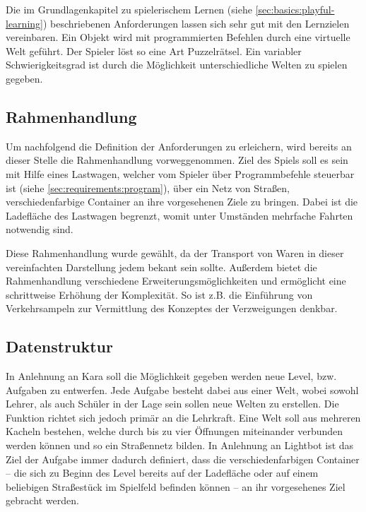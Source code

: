 Die im Grundlagenkapitel zu spielerischem Lernen (siehe \ref{sec:basics:playful-learning}) beschriebenen Anforderungen lassen sich sehr gut mit den Lernzielen vereinbaren. Ein Objekt wird mit programmierten Befehlen durch eine virtuelle Welt geführt. Der Spieler löst so eine Art Puzzelrätsel. Ein variabler Schwierigkeitsgrad ist durch die Möglichkeit unterschiedliche Welten zu spielen gegeben.

\subsection{Rahmenhandlung}
\label{sec:requirements:world:background-story}

Um nachfolgend die Definition der Anforderungen zu erleichern, wird bereits an dieser Stelle die Rahmenhandlung vorweggenommen. Ziel des Spiels soll es sein mit Hilfe eines Lastwagen, welcher vom Spieler über Programmbefehle steuerbar ist (siehe \ref{sec:requirements:program}), über ein Netz von Straßen, verschiedenfarbige Container an ihre vorgesehenen Ziele zu bringen. Dabei ist die Ladefläche des Lastwagen begrenzt, womit unter Umständen mehrfache Fahrten notwendig sind.

Diese Rahmenhandlung wurde gewählt, da der Transport von Waren in dieser vereinfachten Darstellung jedem bekant sein sollte. Außerdem bietet die Rahmenhandlung verschiedene Erweiterungsmöglichkeiten und ermöglicht eine schrittweise Erhöhung der Komplexität. So ist z.B. die Einführung von Verkehrsampeln zur Vermittlung des Konzeptes der Verzweigungen denkbar.

\subsection{Datenstruktur}
\label{sec:requirements:world:structure}

In Anlehnung an Kara soll die Möglichkeit gegeben werden neue Level, bzw. Aufgaben zu entwerfen. Jede Aufgabe besteht dabei aus einer Welt, wobei sowohl Lehrer, als auch Schüler in der Lage sein sollen neue Welten zu erstellen. Die Funktion richtet sich jedoch primär an die Lehrkraft. Eine Welt soll aus mehreren Kacheln bestehen, welche durch bis zu vier Öffnungen miteinander verbunden werden können und so ein Straßennetz bilden. In Anlehnung an Lightbot ist das Ziel der Aufgabe immer dadurch definiert, dass die verschiedenfarbigen Container -- die sich zu Beginn des Level bereits auf der Ladefläche oder auf einem beliebigen Straßestück im Spielfeld befinden können -- an ihr vorgesehenes Ziel gebracht werden.

